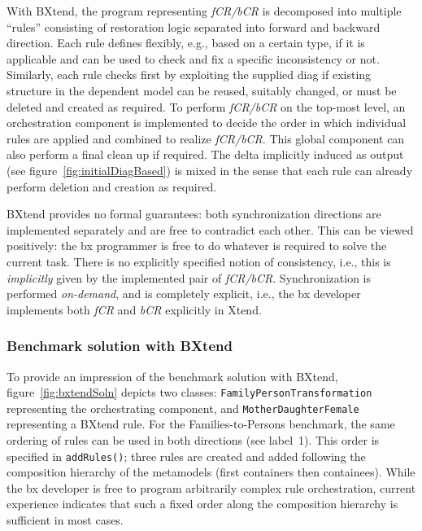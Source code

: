 With BXtend, the program representing \emph{fCR/bCR} is decomposed into multiple ``rules'' consisting of restoration logic separated into forward and backward direction.
Each rule defines flexibly, e.g., based on a certain type, if it is applicable and can be used to check and fix a specific inconsistency or not.
Similarly, each rule checks first by exploiting the supplied diag if existing structure in the dependent model can be reused, suitably changed, or must be deleted and created as required.
To perform \emph{fCR/bCR} on the top-most level, an orchestration component is implemented to decide the order in which individual rules are applied and combined to realize \emph{fCR/bCR}.
This global component can also perform a final clean up if required.
The delta implicitly induced as output (see figure~\ref{fig:initialDiagBased}) is mixed in the sense that each rule can already perform deletion and creation as required.

BXtend provides no formal guarantees: both synchronization directions are implemented separately and are free to contradict each other.
This can be viewed positively: the bx programmer is free to do whatever is required to solve the current task.
%
There is no explicitly specified notion of consistency, i.e., this is \emph{implicitly} given by the implemented pair of \emph{fCR/bCR}.
%
Synchronization is performed \emph{on-demand}, and is completely explicit, i.e., the bx developer implements both \emph{fCR} and \emph{bCR} explicitly in Xtend.

\subsubsection{Benchmark solution with BXtend}

To provide an impression of the benchmark solution with BXtend, figure~\ref{fig:bxtendSoln} depicts two classes:  \texttt{Family\-Person\-Transforma\-tion} representing the orchestrating component, and \texttt{Mother\-Daughter\-Female} representing a BXtend rule.
For the Families-to-Persons benchmark, the same ordering of rules can be used in both directions (see label~1).
This order is specified in \texttt{addRules()}; three rules are created and added following the composition hierarchy of the metamodels (first containers then containees).
While the bx developer is free to program arbitrarily complex rule orchestration, current experience indicates that such a fixed order along the composition hierarchy is sufficient in most cases.


